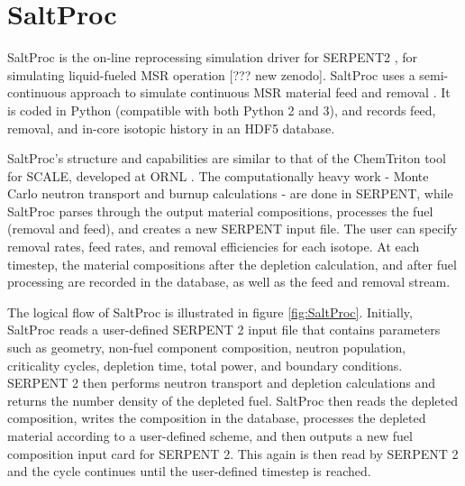 \section{SaltProc}
\label{sec:saltproc}

SaltProc is the on-line reprocessing simulation
driver for SERPENT2 \cite{leppanen_serpent_2015},
for simulating liquid-fueled \gls{MSR} operation [??? new zenodo].
SaltProc uses a semi-continuous approach to simulate
continuous \gls{MSR} material feed and removal \cite{rykhlevskii_online_2017}.
It is coded in Python (compatible with both Python 2 and 3), and
records feed, removal, and in-core isotopic history in an HDF5 \cite{the_hdf_group_hierarchical_1997} database.

SaltProc's structure and capabilities are similar to that of the
ChemTriton tool for SCALE, developed at ORNL \cite{betzler_molten_2017}.
The computationally heavy work - Monte Carlo neutron transport and
burnup calculations - are done in SERPENT, while SaltProc parses through
the output material compositions, processes the fuel (removal and feed),
and creates a new SERPENT input file. The user can specify removal
rates, feed rates, and removal efficiencies for each isotope. At each
timestep, the material compositions after the
depletion calculation, and after fuel processing are recorded in the
database, as well as the feed and removal stream.

The logical flow of SaltProc is illustrated in figure \ref{fig:SaltProc}.
Initially, SaltProc reads a user-defined SERPENT 2 input file that
contains parameters such as  geometry, non-fuel component composition,
neutron population, criticality cycles, depletion time, total power, and boundary conditions.
SERPENT 2 then performs neutron transport and depletion calculations and 
returns the number density of the depleted fuel. SaltProc then reads the
depleted composition, writes the composition in the database, processes
the depleted material according to a user-defined scheme, and then
outputs a new fuel composition input card for SERPENT 2. This again
is then read by SERPENT 2 and the cycle continues until the user-defined
timestep is reached.

